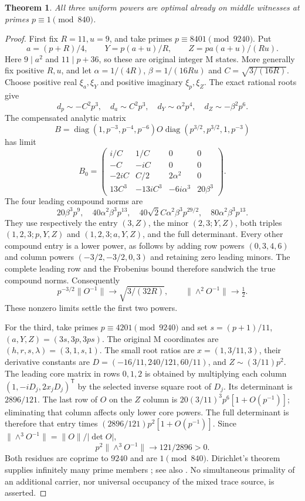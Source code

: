 \documentclass[10pt,reqno]{amsart}
\newtheorem{theorem}{Theorem}\newtheorem{proposition}[theorem]{Proposition}
\begin{document}
\begin{theorem}
All three uniform powers are optimal already on middle witnesses at primes
$p\equiv1\pmod{840}$.
\end{theorem}
\begin{proof}
First fix $R=11,u=9$, and take primes $p\equiv8401\pmod{9240}$.
Put
\[
 a=(p+R)/4,\qquad Y=p(a+u)/R,\qquad Z=pa(a+u)/(Ru).
\]
Here $9\mid a^2$ and $11\mid p+36$, so these are original integer M states.
More generally fix positive $R,u$, and let
$\alpha=1/(4R)$, $\beta=1/(16Ru)$ and $C=\sqrt{3/(16R)}$.
Choose positive real $\xi_a,\xi_Y$ and positive imaginary $\xi_p,\xi_Z$.
The exact rational roots give
\[
 d_p\sim-C^2p^3,\quad d_a\sim C^2p^3,\quad
 d_Y\sim\alpha^2p^4,\quad d_Z\sim-\beta^2p^6.
\]
The compensated analytic matrix
\[
 B=\operatorname{diag}(1,p^{-3},p^{-4},p^{-6})O
 \operatorname{diag}(p^{3/2},p^{3/2},1,p^{-3})
\]
has limit
\[
 B_0=\begin{pmatrix}
i/C&1/C&0&0\\-C&-iC&0&0\\
-2iC&C/2&2\alpha^2&0\\
13C^3&-13iC^3&-6i\alpha^3&20\beta^3
\end{pmatrix}.
\]
The four leading compound norms are
\[
20\beta^3p^9,\quad40\alpha^2\beta^3p^{13},\quad
40\sqrt2C\alpha^2\beta^3p^{29/2},\quad80\alpha^2\beta^3p^{13}.
\]
They use respectively the entry $(3,Z)$, the minor $(2,3;Y,Z)$, both
triples $(1,2,3;p,Y,Z)$ and $(1,2,3;a,Y,Z)$, and the full determinant.
Every other compound entry is a lower power, as follows by adding row
powers $(0,3,4,6)$ and column powers $(-3/2,-3/2,0,3)$ and retaining zero
leading minors. The complete leading row and the Frobenius bound therefore
sandwich the true compound norms. Consequently
\[
 p^{-3/2}\|O^{-1}\|\to\sqrt{3/(32R)},\qquad
 \|\wedge^2O^{-1}\|\to\tfrac12.
\]
These nonzero limits settle the first two powers.

For the third, take primes $p\equiv4201\pmod{9240}$ and set
$s=(p+1)/11$, $(a,Y,Z)=(3s,3p,3ps)$.
The original M coordinates are $(h,r,s,\lambda)=(3,1,s,1)$.
The small root ratios are $x=(1,3/11,3)$, their derivative constants are
$D=(-16/11,240/121,60/11)$, and $Z\sim(3/11)p^2$.
The leading core matrix in rows $0,1,2$ is obtained by multiplying each
column $(1,-iD_j,2x_jD_j)^{\mathsf T}$ by the selected inverse square root
of $D_j$. Its determinant is $2896/121$. The last row of $O$ on the $Z$
column is $20(3/11)^3p^6[1+O(p^{-1})]$; eliminating that column affects
only lower core powers. The full determinant is therefore that entry times
$(2896/121)p^2[1+O(p^{-1})]$. Since
$\|\wedge^3O^{-1}\|=\|O\|/|\det O|$,
\[
 p^2\|\wedge^3O^{-1}\|\longrightarrow121/2896>0.
\]
Both residues are coprime to $9240$ and are $1\pmod{840}$.
Dirichlet's theorem supplies infinitely many prime members
\citep{DirichletOriginal}; see also \citet[Theorem 18.1]{Dirichlet}.
No simultaneous primality of an additional
carrier, nor universal occupancy of the mixed trace source, is asserted.
\end{proof}
\end{document}
